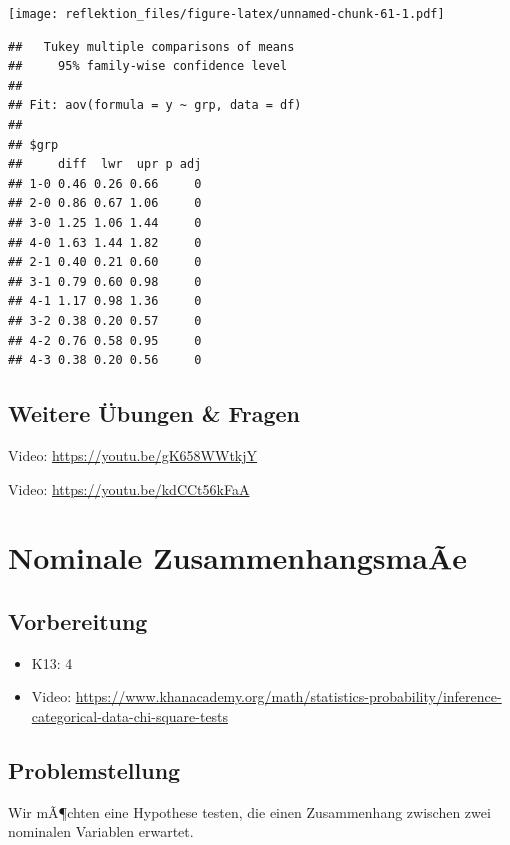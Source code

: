 \documentclass[
]{book}
\providecommand{\tightlist}{%
  \setlength{\itemsep}{0pt}\setlength{\parskip}{0pt}}
\begin{document}
\texttt{[image: reflektion\_files/figure-latex/unnamed-chunk-61-1.pdf]}

\begin{verbatim}
##   Tukey multiple comparisons of means
##     95% family-wise confidence level
## 
## Fit: aov(formula = y ~ grp, data = df)
## 
## $grp
##     diff  lwr  upr p adj
## 1-0 0.46 0.26 0.66     0
## 2-0 0.86 0.67 1.06     0
## 3-0 1.25 1.06 1.44     0
## 4-0 1.63 1.44 1.82     0
## 2-1 0.40 0.21 0.60     0
## 3-1 0.79 0.60 0.98     0
## 4-1 1.17 0.98 1.36     0
## 3-2 0.38 0.20 0.57     0
## 4-2 0.76 0.58 0.95     0
## 4-3 0.38 0.20 0.56     0
\end{verbatim}

\hypertarget{weitere-uxfcbungen-fragen}{%
\section{Weitere Übungen \& Fragen}\label{weitere-uxfcbungen-fragen}}

Video: \url{https://youtu.be/gK658WWtkjY}

Video: \url{https://youtu.be/kdCCt56kFaA}

\hypertarget{nominale-zusammenhangsmauxe3e}{%
\chapter{Nominale ZusammenhangsmaÃe}\label{nominale-zusammenhangsmauxe3e}}

\hypertarget{vorbereitung-4}{%
\section{Vorbereitung}\label{vorbereitung-4}}

\begin{itemize}
\tightlist
\item
  K13: 4
\item
  Video: \url{https://www.khanacademy.org/math/statistics-probability/inference-categorical-data-chi-square-tests}
\end{itemize}

\hypertarget{problemstellung-4}{%
\section{Problemstellung}\label{problemstellung-4}}

Wir mÃ¶chten eine Hypothese testen, die einen Zusammenhang zwischen zwei nominalen Variablen erwartet.
\end{document}
